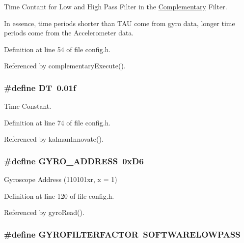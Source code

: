Time Contant for Low and High Pass Filter in the \hyperlink{struct_complementary}{Complementary} Filter. 

In essence, time periods shorter than T\-A\-U come from gyro data, longer time periods come from the Accelerometer data. 

Definition at line 54 of file config.\-h.



Referenced by complementary\-Execute().

\hypertarget{group__config_ga943f07034774ef1261d62cd0d3d1fec9}{
\subsubsection[{D\-T}]{\setlength{\rightskip}{0pt plus 5cm}\#define D\-T~0.\-01f}}\label{group__config_ga943f07034774ef1261d62cd0d3d1fec9}


Time Constant. 



Definition at line 74 of file config.\-h.



Referenced by kalman\-Innovate().

\hypertarget{group__config_ga8ed1f343e82440b4ef900e5fe42d74f0}{
\subsubsection[{G\-Y\-R\-O\-\_\-\-A\-D\-D\-R\-E\-S\-S}]{\setlength{\rightskip}{0pt plus 5cm}\#define G\-Y\-R\-O\-\_\-\-A\-D\-D\-R\-E\-S\-S~0x\-D6}}\label{group__config_ga8ed1f343e82440b4ef900e5fe42d74f0}


Gyroscope Address (110101xr, x = 1) 



Definition at line 120 of file config.\-h.



Referenced by gyro\-Read().

\hypertarget{group__config_ga1b5d47810976ecbfd688513246db3ba9}{
\subsubsection[{G\-Y\-R\-O\-F\-I\-L\-T\-E\-R\-F\-A\-C\-T\-O\-R}]{\setlength{\rightskip}{0pt plus 5cm}\#define G\-Y\-R\-O\-F\-I\-L\-T\-E\-R\-F\-A\-C\-T\-O\-R~{\bf S\-O\-F\-T\-W\-A\-R\-E\-L\-O\-W\-P\-A\-S\-S}}}\label{group__config_ga1b5d47810976ecbfd688513246db3ba9}


